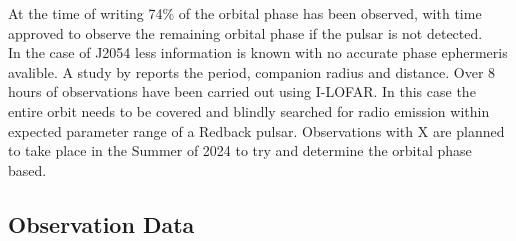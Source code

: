 At the time of writing 74\% of the orbital phase has been observed, with time approved to observe the remaining orbital phase if the pulsar is not detected. \\

In the case of J2054 less information is known with no accurate phase ephermeris avalible. A study by \cite{karpova_new_2023} reports the period, companion radius and distance. Over 8 hours of observations have been carried out using I-LOFAR. In this case the entire orbit needs to be covered and blindly searched for radio emission within expected parameter range of a Redback pulsar. Observations with X are planned to take place in the Summer of 2024 to try and determine the orbital phase based. 

\begin{figure} %
    \centering
    \qquad
    \caption{ }%
    \label{fig: velocities}%
\end{figure}

\subsection{Observation Data}


